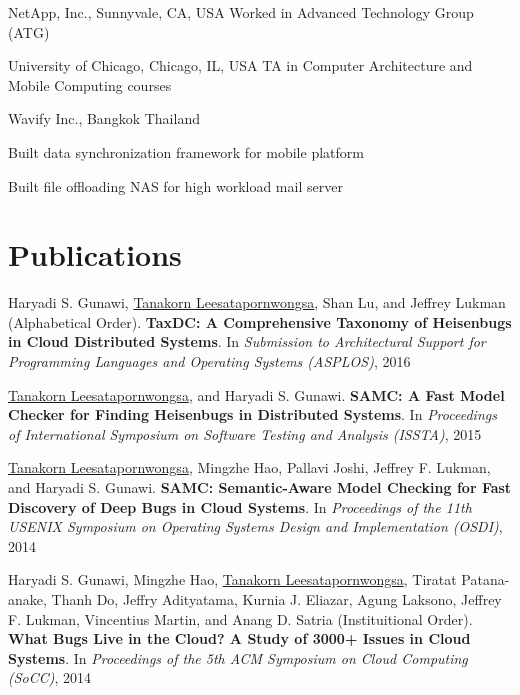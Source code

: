 \documentclass[10pt]{article} %
\begin{document}
{NetApp, Inc., Sunnyvale, CA, USA}
{Worked in Advanced Technology Group (ATG)} 

{University of Chicago, Chicago, IL, USA}
{TA in Computer Architecture and Mobile Computing courses} 

{Wavify Inc., Bangkok Thailand}
{\begin{minipage}{\smallertextwidth}
\begin{itemize-noindent}
\setlength\itemsep{-1ex}
\item Built data synchronization framework for mobile platform
\item Built file offloading NAS for high workload mail server
\end{itemize-noindent}
\end{minipage}}


\section{Publications}

Haryadi S. Gunawi, \underline{Tanakorn Leesatapornwongsa}, Shan Lu, and Jeffrey
Lukman (Alphabetical Order). \textbf{TaxDC: A Comprehensive Taxonomy of
Heisenbugs in Cloud Distributed Systems}. In \textit{Submission to
Architectural Support for Programming Languages and Operating Systems
(ASPLOS)}, 2016 
\vspace{2mm}

\underline{Tanakorn Leesatapornwongsa}, and Haryadi S. Gunawi. \textbf{SAMC: A
Fast Model Checker for Finding Heisenbugs in Distributed Systems}. In
\textit{Proceedings of International Symposium on Software Testing and Analysis
(ISSTA)}, 2015
\vspace{2mm}

\underline{Tanakorn Leesatapornwongsa}, Mingzhe Hao, Pallavi Joshi, Jeffrey F.
Lukman, and Haryadi S. Gunawi. \textbf{SAMC: Semantic-Aware Model Checking for
Fast Discovery of Deep Bugs in Cloud Systems}. In \textit{Proceedings of the
11th USENIX Symposium on Operating Systems Design and Implementation (OSDI)},
2014
\vspace{2mm}

Haryadi S. Gunawi, Mingzhe Hao, \underline{Tanakorn Leesatapornwongsa}, Tiratat
Patana-anake, Thanh Do, Jeffry Adityatama, Kurnia J. Eliazar, Agung Laksono,
Jeffrey F. Lukman, Vincentius Martin, and Anang D. Satria (Instituitional Order).
\textbf{What Bugs Live in the Cloud? A Study of 3000+ Issues in Cloud Systems}.
In \textit{Proceedings of the 5th ACM Symposium on Cloud Computing (SoCC)}, 2014
\vspace{2mm}
\end{document}
